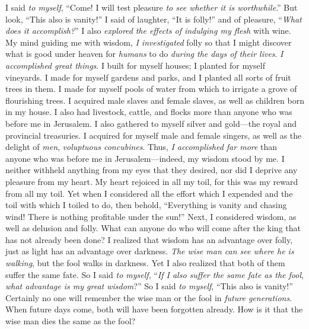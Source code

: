 \begin{biblechapter} %
 I said \textit{to myself}, “Come! I will test pleasure \textit{to see whether it is worthwhile}.” But look, “This also is vanity!”
\verse I said of laughter, “It is folly!” and of pleasure, “\textit{What does it accomplish?}”
\verse I also \textit{explored} \textit{the effects of indulging my flesh} with wine. My mind guiding me with wisdom, \textit{I investigated} folly so that I might discover what is good under heaven for \textit{humans} to do \textit{during the days of their lives}.
 \textit{I accomplished great things}. I built for myself houses; I planted for myself vineyards.
\verse I made for myself gardens and parks, and I planted all sorts of fruit trees in them.
\verse I made for myself pools of water from which to irrigate a grove of flourishing trees.
\verse I acquired male slaves and female slaves, as well as children born in my house. I also had livestock, cattle, and flocks more than anyone who was before me in Jerusalem.
\verse I also gathered to myself silver and gold—the royal and provincial treasuries. I acquired for myself male and female singers, as well as the delight of \textit{men}, \textit{voluptuous concubines}.
\verse Thus, \textit{I accomplished far more} than anyone who was before me in Jerusalem—indeed, my wisdom stood by me.
\verse I neither withheld anything from my eyes that they desired, nor did I deprive any pleasure from my heart. My heart rejoiced in all my toil, for this was my reward from all my toil.
\verse Yet when I considered all the effort which I expended and the toil with which I toiled to do, then behold, “Everything is vanity and chasing wind! There is nothing profitable under the sun!”
 Next, I considered wisdom, as well as delusion and folly. What can anyone do who will come after the king that has not already been done?
\verse I realized that wisdom has an advantage over folly, just as light has an advantage over darkness.
\verse \textit{The wise man can see where he is walking}, but the fool walks in darkness. Yet I also realized that both of them suffer the same fate.
\verse So I said \textit{to myself}, “\textit{If I also suffer the same fate as the fool}, \textit{what advantage is my great wisdom}?” So I said \textit{to myself}, “This also is vanity!”
\verse Certainly no one will remember the wise man or the fool in \textit{future generations}. When future days come, both will have been forgotten already. How is it that the wise man dies the same as the fool?

\end{biblechapter}
